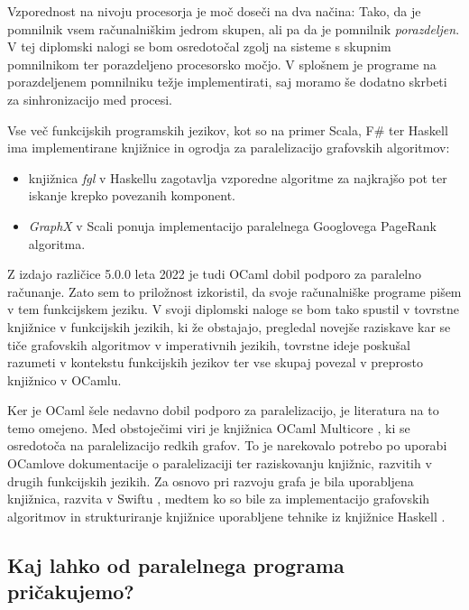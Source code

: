 \documentclass[mat1, tisk]{fmfdelo}
\begin{document}
Vzporednost na nivoju procesorja je moč doseči na dva načina: 
Tako, da je pomnilnik vsem računalniškim jedrom skupen, ali pa da je pomnilnik \textit{porazdeljen}. 
V tej diplomski nalogi se bom osredotočal zgolj na sisteme s skupnim pomnilnikom ter porazdeljeno procesorsko močjo.
V splošnem je programe na porazdeljenem pomnilniku težje implementirati, saj moramo še dodatno skrbeti za sinhronizacijo
med procesi.

Vse več funkcijskih programskih jezikov, kot so na primer Scala, F\# ter Haskell ima implementirane knjižnice
in ogrodja za paralelizacijo grafovskih algoritmov:
\begin{itemize}
    \item knjižnica \textit{fgl} v Haskellu \cite{haskell_fgl} zagotavlja vzporedne algoritme za najkrajšo pot 
    ter iskanje krepko povezanih komponent.
    \item \textit{GraphX} v Scali \cite{graphx} ponuja implementacijo paralelnega Googlovega PageRank algoritma.
\end{itemize}

Z izdajo različice 5.0.0 leta 2022 je tudi OCaml dobil podporo za paralelno računanje. Zato sem to priložnost 
izkoristil, da svoje računalniške programe pišem v tem funkcijskem jeziku. 
V svoji diplomski naloge se bom tako spustil v tovrstne knjižnice v funkcijskih jezikih, ki že obstajajo, 
pregledal novejše raziskave kar se tiče grafovskih algoritmov v imperativnih jezikih, 
tovrstne ideje poskušal razumeti v kontekstu funkcijskih jezikov ter vse skupaj povezal v preprosto knjižnico v OCamlu.

Ker je OCaml šele nedavno dobil podporo za paralelizacijo, je literatura na to temo omejeno.
Med obstoječimi viri je knjižnica OCaml Multicore \cite{ocaml_multicore_500}, ki se osredotoča na paralelizacijo redkih grafov.
To je narekovalo potrebo po uporabi OCamlove dokumentacije o paralelizaciji \cite{ocaml_paralelisation_documentation} ter
raziskovanju knjižnic, razvitih v drugih funkcijskih jezikih. Za osnovo pri razvoju grafa je bila uporabljena knjižnica,
razvita v Swiftu \cite{functional_swift_graph}, medtem ko so bile za implementacijo grafovskih algoritmov in strukturiranje
knjižnice uporabljene tehnike iz knjižnice Haskell \cite{haskell_fgl}.

\subsection{Kaj lahko od paralelnega programa pričakujemo?}
\end{document}
